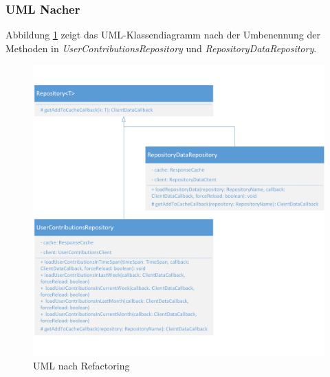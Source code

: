 \documentclass[12pt]{article}
\begin{document}
\subsubsection{UML Nacher}
Abbildung \ref{fig:RenameMethod_Refactoring_After} zeigt das UML-Klassendiagramm nach der Umbenennung der Methoden in \textit{UserContributionsRepository} und \textit{RepositoryDataRepository}.
\begin{figure}[h]
  \includegraphics{refactoring_rename_method_repository_after.png}
  \caption{UML nach Refactoring}
  \label{fig:RenameMethod_Refactoring_After}
\end{figure}
\newpage
\end{document}
